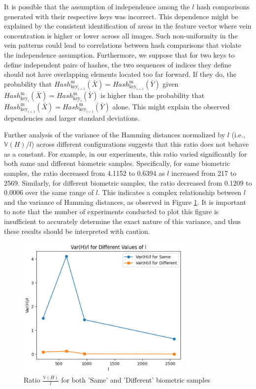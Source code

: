 It is possible that the assumption of independence among the \(l\) hash comparisons generated with their respective keys was incorrect. This dependence might be explained by the consistent identification of areas in the feature vector where vein concentration is higher or lower across all images. Such non-uniformity in the vein patterns could lead to correlations between hash comparisons that violate the independence assumption. Furthermore, we suppose that for two keys to define independent pairs of hashes, the two sequences of indices they define should not have overlapping elements located too far forward. If they do, the probability that \( Hash_{\text{key}_{i+1}}^\text{m}(\bar{X}) = Hash_{\text{key}_{i+1}}^\text{m}(\bar{Y}) \) given \( Hash_{\text{key}_{i}}^\text{m}(\bar{X}) = Hash_{\text{key}_{i}}^\text{m}(\bar{Y}) \) is higher than the probability that \( Hash_{\text{key}_{i+1}}^\text{m}(\bar{X}) = Hash_{\text{key}_{i+1}}^\text{m}(\bar{Y}) \)
alone. This might explain the observed dependencies and larger standard deviations.

Further analysis of the variance of the Hamming distances normalized by \( l \) (i.e., \(\mathbb{V}(H) / l\)) across different configurations suggests that this ratio does not behave as a constant. For example, in our experiments, this ratio varied significantly for both same and different biometric samples. Specifically, for same biometric samples, the ratio decreased from 4.1152 to 0.6394 as \( l \) increased from 217 to 2569. Similarly, for different biometric samples, the ratio decreased from 0.1209 to 0.0006 over the same range of \( l \). This indicates a complex relationship between \( l \) and the variance of Hamming distances, as observed in Figure \ref{variance_iterations}. It is important to note that the number of experiments conducted to plot this figure is insufficient to accurately determine the exact nature of this variance, and thus these results should be interpreted with caution.

\begin{figure}[H]
    \centering
    \includegraphics[width=\linewidth,height=7cm,keepaspectratio]{latex-img/variance_iterations.png}
    \caption{Ratio \(\frac{\mathbb{V}(H)}{l}\) for both 'Same' and 'Different' biometric samples}
    \label{variance_iterations}
\end{figure}

